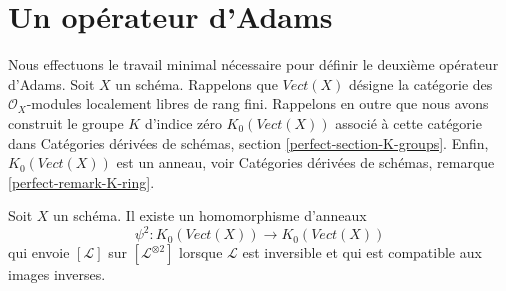 \section{Un opérateur d'Adams}
\label{section-adams}

\noindent
Nous effectuons le travail minimal nécessaire pour définir le deuxième opérateur d'Adams.
Soit $X$ un schéma. Rappelons que $\textit{Vect}(X)$ désigne la
catégorie des $\mathcal{O}_X$-modules localement libres de rang fini.
Rappelons en outre que nous avons construit le groupe $K$ d'indice zéro
$K_0(\textit{Vect}(X))$ associé à cette catégorie dans
Catégories dérivées de schémas, section \ref{perfect-section-K-groups}.
Enfin, $K_0(\textit{Vect}(X))$ est un anneau, voir
Catégories dérivées de schémas, remarque \ref{perfect-remark-K-ring}.

\begin{lemma}
\label{lemma-second-adams-operator}
Soit $X$ un schéma. Il existe un homomorphisme d'anneaux
$$
\psi^2 :
K_0(\textit{Vect}(X))
\longrightarrow
K_0(\textit{Vect}(X))
$$
qui envoie $[\mathcal{L}]$ sur $[\mathcal{L}^{\otimes 2}]$
lorsque $\mathcal{L}$ est inversible et qui est compatible aux images inverses.
\end{lemma}

